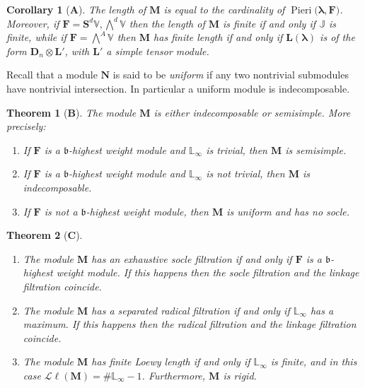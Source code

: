 \documentclass[11pt,fleqn]{amsart}
\newcommand\JJ{\mathbb J}
\newcommand\LL{\mathbb L}
\newtheorem*{thm*}{Theorem}
\newtheorem*{cor*}{Corollary}
\theoremstyle{definition}
\theoremstyle{remark}
\theoremstyle{remark}
\newcommand\VV{\mathbb V}
\renewcommand\SS{\mathbf S}
\newcommand\lie[1]{\mathfrak{#1}}
\newcommand\wt[1]{\boldsymbol{#1}}
\newcommand\Pieri[2]{\operatorname{Pieri}{(#1},{#2)}}
\begin{document}
\begin{cor*}[\textbf A]
The length of $\mathbf M$ is equal to the cardinality of $\Pieri{\wt\lambda}
{\mathbf F}$. Moreover, if $\mathbf F =\SS^d\VV, \bigwedge^d \VV$ then the length
of $\mathbf M$ is finite if and only if $\JJ$ is finite, while if $\mathbf F
= \bigwedge^A \VV$ then $\mathbf M$ has finite length if and only if $\mathbf 
L(\wt\lambda)$ is of the form $\mathbf D_n \otimes \mathbf L'$, with $\mathbf 
L'$ a simple tensor module.
\end{cor*}

Recall that a module $\mathbf N$ is said to be \emph{uniform} if any two 
nontrivial submodules have nontrivial intersection. In particular a uniform 
module is indecomposable. 
\begin{thm*}[\textbf B]
The module $\mathbf M$ is either indecomposable or semisimple. More precisely:
\begin{enumerate}
  \item If $\mathbf F$ is a $\lie b$-highest weight module and 
    $\LL_{\infty}$ is trivial, then $\mathbf M$ is semisimple.

  \item If $\mathbf F$ is a $\lie b$-highest weight module and 
    $\LL_{\infty}$ is not trivial, then $\mathbf M$ is indecomposable.

  \item If $\mathbf F$ is not a $\lie b$-highest weight module, then 
    $\mathbf M$ is uniform and has no socle.
\end{enumerate}
\end{thm*}

\begin{thm*}[\textbf C] 
\begin{enumerate}
  \item The module $\mathbf M$ has an exhaustive socle filtration if and only 
    if $\mathbf F$ is a $\lie b$-highest weight module. If this 
    happens then the socle filtration and the linkage filtration coincide. 

  \item The module $\mathbf M$ has a separated radical filtration if and only 
    if $\LL_\infty$ has a maximum. If this happens then the radical filtration 
    and the linkage filtration coincide. 

  \item The module $\mathbf M$ has finite Loewy length if and only if 
    $\LL_\infty$ is finite, and in this case $\mathcal L\ell(\mathbf M) = 
    \#\LL_\infty - 1$. Furthermore, $\mathbf M$ is rigid.
\end{enumerate}
\end{thm*}
\end{document}
